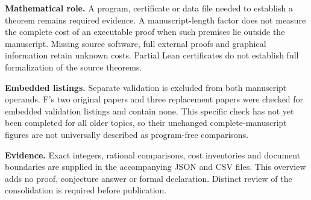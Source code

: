\documentclass[11pt,a4paper]{article}
\begin{document}
\textbf{Mathematical role.} A program, certificate or data file needed to
establish a theorem remains required evidence. A manuscript-length factor
does not measure the complete cost of an executable proof when such
premises lie outside the manuscript. Missing source software, full external
proofs and graphical information retain unknown costs. Partial Lean
certificates do not establish full formalization of the source theorems.

\textbf{Embedded listings.} Separate validation is excluded from both
manuscript operands. F's two original papers and three replacement papers
were checked for embedded validation listings and contain none. This
specific check has not yet been completed for all older topics, so their
unchanged complete-manuscript figures are not universally described as
program-free comparisons.

\textbf{Evidence.} Exact integers, rational comparisons, cost inventories
and document boundaries are supplied in the accompanying JSON and CSV
files. This overview adds no proof, conjecture answer or formal declaration.
Distinct review of the consolidation is required before publication.
\end{document}

